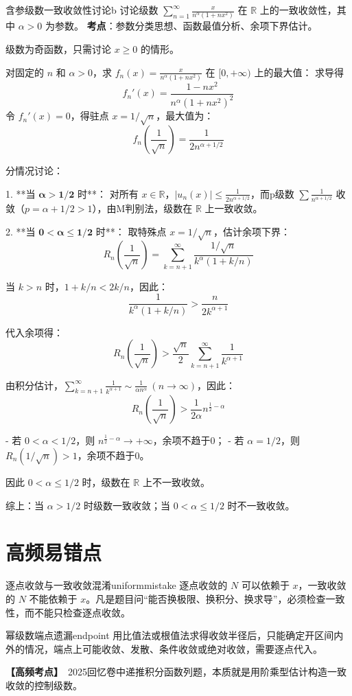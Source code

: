\documentclass[UTF8,zihao=-4,openany]{ctexbook}
\newcommand{\examkey}{\textcolor{warnred}{\bfseries【高频考点】}}
\begin{document}
\begin{example}{含参级数一致收敛性讨论}{b}
讨论级数 $\displaystyle \sum_{n=1}^{\infty} \frac{x}{n^\alpha (1 + n x^2)}$ 在 $\mathbb{R}$ 上的一致收敛性，其中 $\alpha>0$ 为参数。
\tcblower
\smallskip
\noindent \textbf{考点}：参数分类思想、函数最值分析、余项下界估计。


级数为奇函数，只需讨论 $x \geq 0$ 的情形。

对固定的 $n$ 和 $\alpha>0$，求 $f_n(x) = \frac{x}{n^\alpha (1 + n x^2)}$ 在 $[0,+\infty)$ 上的最大值：
求导得
$$
f_n'(x) = \frac{1 - n x^2}{n^\alpha (1 + n x^2)^2}
$$
令 $f_n'(x)=0$，得驻点 $x = 1/\sqrt{n}$，最大值为：
$$
f_n\left( \frac{1}{\sqrt{n}} \right) = \frac{1}{2 n^{\alpha + 1/2}}
$$

分情况讨论：

1. **当 $\boldsymbol{\alpha > 1/2}$ 时**：
对所有 $x \in \mathbb{R}$，$|u_n(x)| \leq \frac{1}{2 n^{\alpha + 1/2}}$，而p级数 $\sum \frac{1}{n^{\alpha + 1/2}}$ 收敛（$p=\alpha+1/2>1$），由M判别法，级数在 $\mathbb{R}$ 上一致收敛。

2. **当 $\boldsymbol{0 < \alpha \leq 1/2}$ 时**：
取特殊点 $x = 1/\sqrt{n}$，估计余项下界：
$$
R_n\left( \frac{1}{\sqrt{n}} \right) = \sum_{k=n+1}^\infty \frac{1/\sqrt{n}}{k^\alpha (1 + k/n)}
$$

当 $k > n$ 时，$1 + k/n < 2k/n$，因此：
$$
\frac{1}{k^\alpha (1 + k/n)} > \frac{n}{2 k^{\alpha + 1}}
$$

代入余项得：
$$
R_n\left( \frac{1}{\sqrt{n}} \right) > \frac{\sqrt{n}}{2} \sum_{k=n+1}^\infty \frac{1}{k^{\alpha + 1}}
$$

由积分估计，$\sum_{k=n+1}^\infty \frac{1}{k^{\alpha+1}} \sim \frac{1}{\alpha n^\alpha}\ (n \to \infty)$，因此：
$$
R_n\left( \frac{1}{\sqrt{n}} \right) > \frac{1}{2\alpha} n^{\frac{1}{2} - \alpha}
$$

- 若 $0<\alpha<1/2$，则 $n^{\frac{1}{2}-\alpha} \to +\infty$，余项不趋于0；
- 若 $\alpha=1/2$，则 $R_n(1/\sqrt{n}) > 1$，余项不趋于0。

因此 $0<\alpha\leq1/2$ 时，级数在 $\mathbb{R}$ 上不一致收敛。

\medskip
综上：当 $\alpha > 1/2$ 时级数一致收敛；当 $0 < \alpha \leq 1/2$ 时不一致收敛。

\end{example}








\section{高频易错点}
\begin{mistake}{逐点收敛与一致收敛混淆}{uniformmistake}
逐点收敛的 $N$ 可以依赖于 $x$，一致收敛的 $N$ 不能依赖于 $x$。凡是题目问“能否换极限、换积分、换求导”，必须检查一致性，而不能只检查逐点收敛。
\end{mistake}
\begin{mistake}{幂级数端点遗漏}{endpoint}
用比值法或根值法求得收敛半径后，只能确定开区间内外的情况，端点上可能收敛、发散、条件收敛或绝对收敛，需要逐点代入。
\end{mistake}
\examkey\ 2025回忆卷中递推积分函数列题，本质就是用阶乘型估计构造一致收敛的控制级数。
\end{document}
